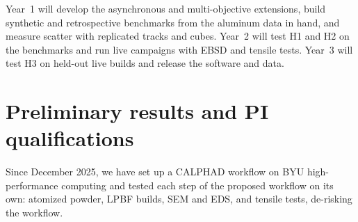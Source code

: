 \documentclass[12pt,letterpaper]{article}
\begin{document}
Year~1 will develop the asynchronous and multi-objective extensions, build
synthetic and retrospective benchmarks from the aluminum data in hand, and
measure scatter with replicated tracks and cubes. Year~2 will test H1 and H2
on the benchmarks and run live campaigns with EBSD and tensile tests. Year~3 will test H3 on held-out live builds and
release the software and data.

\section{Preliminary results and PI qualifications}

Since December 2025, we have set up a CALPHAD workflow on BYU high-performance computing and tested each step of the proposed workflow on its own: atomized powder,
LPBF builds, SEM and EDS, and tensile tests, de-risking the workflow.
\end{document}
